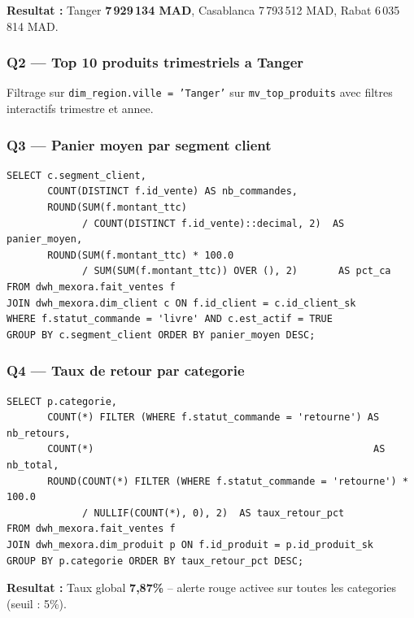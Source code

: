 \documentclass[12pt,a4paper]{article}
\begin{document}
\textbf{Resultat :} Tanger \textbf{7\,929\,134 MAD}, Casablanca 7\,793\,512 MAD, Rabat 6\,035\,814 MAD.

\subsubsection{Q2 --- Top 10 produits trimestriels a Tanger}

Filtrage sur \texttt{dim\_region.ville = 'Tanger'} sur \texttt{mv\_top\_produits} avec filtres interactifs
trimestre et annee.

\subsubsection{Q3 --- Panier moyen par segment client}

\begin{lstlisting}[style=sql, caption=Panier moyen et part de CA par segment]
SELECT c.segment_client,
       COUNT(DISTINCT f.id_vente) AS nb_commandes,
       ROUND(SUM(f.montant_ttc)
             / COUNT(DISTINCT f.id_vente)::decimal, 2)  AS panier_moyen,
       ROUND(SUM(f.montant_ttc) * 100.0
             / SUM(SUM(f.montant_ttc)) OVER (), 2)       AS pct_ca
FROM dwh_mexora.fait_ventes f
JOIN dwh_mexora.dim_client c ON f.id_client = c.id_client_sk
WHERE f.statut_commande = 'livre' AND c.est_actif = TRUE
GROUP BY c.segment_client ORDER BY panier_moyen DESC;
\end{lstlisting}

\subsubsection{Q4 --- Taux de retour par categorie}

\begin{lstlisting}[style=sql, caption=Taux de retour avec alertes visuelles]
SELECT p.categorie,
       COUNT(*) FILTER (WHERE f.statut_commande = 'retourne') AS nb_retours,
       COUNT(*)                                                AS nb_total,
       ROUND(COUNT(*) FILTER (WHERE f.statut_commande = 'retourne') * 100.0
             / NULLIF(COUNT(*), 0), 2)  AS taux_retour_pct
FROM dwh_mexora.fait_ventes f
JOIN dwh_mexora.dim_produit p ON f.id_produit = p.id_produit_sk
GROUP BY p.categorie ORDER BY taux_retour_pct DESC;
\end{lstlisting}

\textbf{Resultat :} Taux global \textbf{7,87\%} -- alerte rouge activee sur toutes les categories
(seuil : 5\%).
\end{document}
